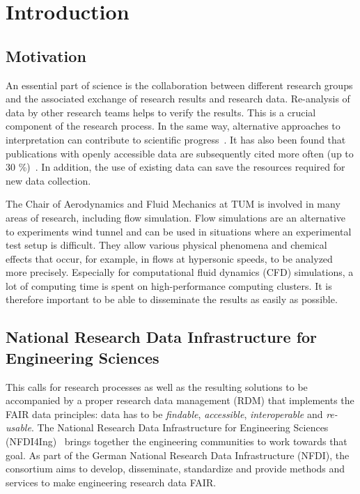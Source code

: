 
\chapter{Introduction}\label{chapter:introduction}

\section{Motivation}

An essential part of science is the collaboration between different research
groups and the associated exchange of research results and research data.
Re-analysis of data by other research teams helps to verify the results. This is
a crucial component of the research process. In the same way, alternative
approaches to interpretation can contribute to scientific
progress~\cite{tenopir2011data}. It has also been found that publications with
openly accessible data are subsequently cited more often (up to 30
\%)~\cite{piwowar2013data}. In addition, the use of existing data can save the
resources required for new data collection. 

The Chair of Aerodynamics and Fluid Mechanics at TUM is involved in many areas
of research, including flow simulation. Flow simulations are an alternative to
experiments wind tunnel and can be used in situations where an experimental test
setup is difficult. They allow various physical phenomena and chemical effects
that occur, for example, in flows at hypersonic speeds, to be analyzed more
precisely. Especially for computational fluid dynamics (CFD) simulations, a lot
of computing time is spent on high-performance computing clusters. It is
therefore important to be able to disseminate the results as easily as possible.

\section{National Research Data Infrastructure for Engineering Sciences}

This calls for research processes as well as the resulting solutions to be
accompanied by a proper research data management (RDM) that implements the FAIR
data principles: data has to be \textit{findable}, \textit{accessible},
\textit{interoperable} and \textit{re-usable}. The National Research Data
Infrastructure for Engineering Sciences (NFDI4Ing)~\cite{schmitt2020nfdi4ing}
brings together the engineering communities to work towards that goal. As part
of the German National Research Data Infrastructure (NFDI), the consortium aims
to develop, disseminate, standardize and provide methods and services to make
engineering research data FAIR. 

